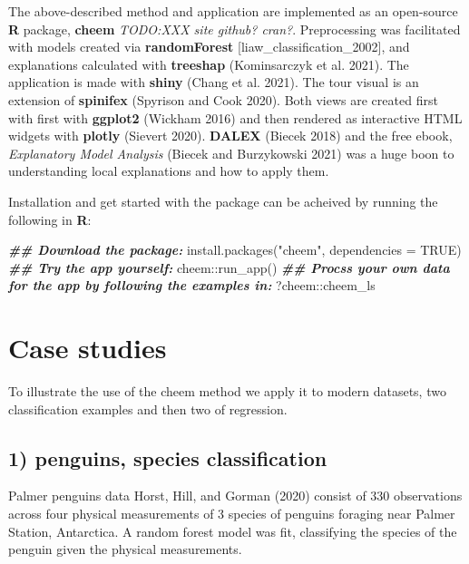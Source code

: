 \documentclass[
]{article}
\newenvironment{Shaded}{\begin{snugshade}}{\end{snugshade}}
\newcommand{\AttributeTok}[1]{\textcolor[rgb]{0.77,0.63,0.00}{#1}}
\newcommand{\ConstantTok}[1]{\textcolor[rgb]{0.00,0.00,0.00}{#1}}
\newcommand{\DocumentationTok}[1]{\textcolor[rgb]{0.56,0.35,0.01}{\textbf{\textit{#1}}}}
\newcommand{\FunctionTok}[1]{\textcolor[rgb]{0.00,0.00,0.00}{#1}}
\newcommand{\NormalTok}[1]{#1}
\newcommand{\SpecialCharTok}[1]{\textcolor[rgb]{0.00,0.00,0.00}{#1}}
\newcommand{\StringTok}[1]{\textcolor[rgb]{0.31,0.60,0.02}{#1}}
\begin{document}
The above-described method and application are implemented as an open-source \textbf{R} package, \textbf{cheem} \emph{TODO:XXX site github? cran?}. Preprocessing was facilitated with models created via \textbf{randomForest} {[}liaw\_classification\_2002{]}, and explanations calculated with \textbf{treeshap} (Kominsarczyk et al. 2021).
The application is made with \textbf{shiny} (Chang et al. 2021). The tour visual is an extension of \textbf{spinifex} (Spyrison and Cook 2020). Both views are created first with first with \textbf{ggplot2} (Wickham 2016) and then rendered as interactive HTML widgets with \textbf{plotly} (Sievert 2020). \textbf{DALEX} (Biecek 2018) and
the free ebook, \emph{Explanatory Model Analysis} (Biecek and Burzykowski 2021) was a huge boon to understanding local explanations and how to apply them.

Installation and get started with the package can be acheived by running the following in \textbf{R}:

\begin{Shaded}
\begin{Highlighting}[]
\DocumentationTok{\#\# Download the package:}
\FunctionTok{install.packages}\NormalTok{(}\StringTok{"cheem"}\NormalTok{, }\AttributeTok{dependencies =} \ConstantTok{TRUE}\NormalTok{)}
\DocumentationTok{\#\# Try the app yourself:}
\NormalTok{cheem}\SpecialCharTok{::}\FunctionTok{run\_app}\NormalTok{()}
\DocumentationTok{\#\# Procss your own data for the app by following the examples in:}
\NormalTok{?cheem}\SpecialCharTok{::}\NormalTok{cheem\_ls}
\end{Highlighting}
\end{Shaded}

\hypertarget{sec:casestudies}{%
\section{Case studies}\label{sec:casestudies}}

To illustrate the use of the cheem method we apply it to modern datasets, two classification examples and then two of regression.

\hypertarget{penguins-species-classification}{%
\subsection{1) penguins, species classification}\label{penguins-species-classification}}

Palmer penguins data Horst, Hill, and Gorman (2020) consist of 330 observations across four physical measurements of 3 species of penguins foraging near Palmer Station, Antarctica. A random forest model was fit, classifying the species of the penguin given the physical measurements.
\end{document}
